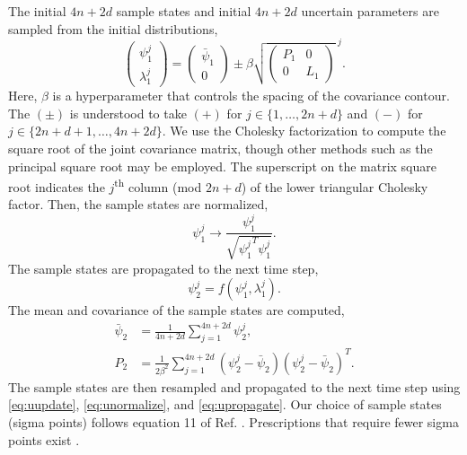 \documentclass[
  amsfonts,
  amsmath,
  amssymb,
  pra,
  twocolumn,
  superscriptaddress,
]{revtex4-2}
\begin{document}
The initial $4n + 2d$ sample states and initial $4n + 2d$
uncertain parameters are sampled from the initial distributions,
\begin{equation}\label{eq:uupdate}
  \begin{pmatrix} \psi_{1}^{j} \\ \lambda_{1}^{j} \end{pmatrix} =
  \begin{pmatrix} \bar{\psi}_{1} \\ 0\end{pmatrix}
    \pm \beta \sqrt{\begin{pmatrix} P_{1} & 0\\ 0 & L_{1}\end{pmatrix}}^{\; j}.
\end{equation}
Here, $\beta$ is a hyperparameter that controls the spacing of the covariance contour.
The $(\pm)$ is understood to take $(+)$ for $j \in \{1, \dots, 2n + d\}$ and $(-)$ for
$j \in \{2n + d + 1, \dots, 4n + 2d\}$. We use the Cholesky factorization
to compute the square root of the
joint covariance matrix, though other methods
such as the principal square root may be employed.
The superscript on the matrix square root indicates the $j$\textsuperscript{th}
column (mod $2n + d$) of the lower triangular Cholesky factor.
Then, the sample states are normalized,
\begin{equation}\label{eq:unormalize}
  \psi_{1}^{j} \rightarrow \frac{\psi_{1}^{j}}{\sqrt{{\psi_{1}^{j}}^{T} \psi_{1}^{j}}}.
\end{equation}
The sample states are propagated to the next time step,
\begin{equation}\label{eq:upropagate}
  \psi^{j}_{2} = f(\psi^{j}_{1}, \lambda^{j}_{1}).
\end{equation}
The mean and covariance of the sample states are computed,
\begin{align}
  \bar{\psi}_{2} &= \frac{1}{4n + 2d} \sum_{j = 1}^{4n + 2d} \psi_{2}^{j},\\
  P_{2} &= \frac{1}{2 \beta^{2}} \sum_{j = 1}^{4n + 2d}
  (\psi^{j}_{2} - \bar{\psi}_{2})(\psi^{j}_{2} - \bar{\psi}_{2})^{T}.
\end{align}
The sample states are then resampled and propagated to the next time step using
\eqref{eq:uupdate}, \eqref{eq:unormalize}, and \eqref{eq:upropagate}. Our
choice of sample states (sigma points) follows equation 11 of Ref.
\cite{julier2004unscented}.
Prescriptions that require fewer sigma points exist \cite{julier2002reduced}.
\end{document}
